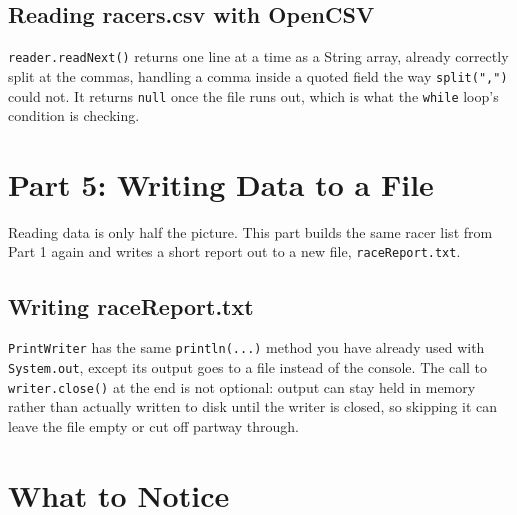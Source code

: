 \documentclass[11pt]{article}
\begin{document}

\subsection{Reading racers.csv with OpenCSV}



\texttt{reader.readNext()} returns one line at a time as a String
array, already correctly split at the commas, handling a comma inside
a quoted field the way \texttt{split(",")} could not. It returns
\texttt{null} once the file runs out, which is what the \texttt{while}
loop's condition is checking.

\section{Part 5: Writing Data to a File}

Reading data is only half the picture. This part builds the same
racer list from Part 1 again and writes a short report out to a new
file, \texttt{raceReport.txt}.

\subsection{Writing raceReport.txt}



\texttt{PrintWriter} has the same \texttt{println(...)} method you
have already used with \texttt{System.out}, except its output goes to
a file instead of the console. The call to \texttt{writer.close()} at
the end is not optional: output can stay held in memory rather than
actually written to disk until the writer is closed, so skipping it
can leave the file empty or cut off partway through.

\section{What to Notice}
\end{document}
